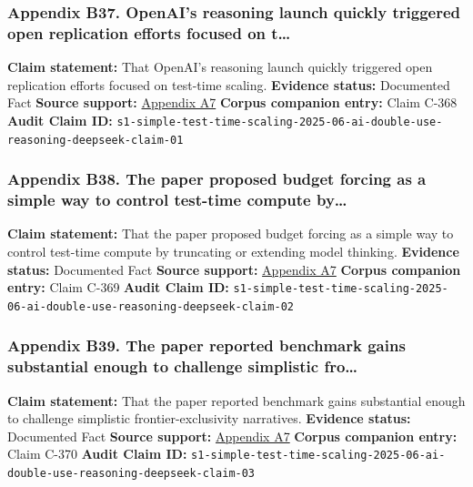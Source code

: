 \documentclass[
  american,
  11pt,
  letterpaper,
]{article}
\begin{document}
\subsubsection{Appendix B37. OpenAI's reasoning launch quickly triggered
open replication efforts focused on
t\ldots{}}\label{appendix-b37-openai-s-reasoning-launch-quickly-triggered-open-replication-efforts-focused-on-t}

\textbf{Claim statement:} That OpenAI's reasoning launch quickly
triggered open replication efforts focused on test-time scaling.
\textbf{Evidence status:} Documented Fact \textbf{Source support:}
\hyperref[appendix-a7-s1-simple-test-time-scaling]{Appendix A7}
\textbf{Corpus companion entry:} Claim C-368 \textbf{Audit Claim ID:}
\texttt{s1-simple-test-time-scaling-2025-06-ai-double-use-reasoning-deepseek-claim-01}

\subsubsection{Appendix B38. The paper proposed budget forcing as a
simple way to control test-time compute
by\ldots{}}\label{appendix-b38-the-paper-proposed-budget-forcing-as-a-simple-way-to-control-test-time-compute-by}

\textbf{Claim statement:} That the paper proposed budget forcing as a
simple way to control test-time compute by truncating or extending model
thinking. \textbf{Evidence status:} Documented Fact \textbf{Source
support:} \hyperref[appendix-a7-s1-simple-test-time-scaling]{Appendix
A7} \textbf{Corpus companion entry:} Claim C-369 \textbf{Audit Claim
ID:}
\texttt{s1-simple-test-time-scaling-2025-06-ai-double-use-reasoning-deepseek-claim-02}

\subsubsection{Appendix B39. The paper reported benchmark gains
substantial enough to challenge simplistic
fro\ldots{}}\label{appendix-b39-the-paper-reported-benchmark-gains-substantial-enough-to-challenge-simplistic-fro}

\textbf{Claim statement:} That the paper reported benchmark gains
substantial enough to challenge simplistic frontier-exclusivity
narratives. \textbf{Evidence status:} Documented Fact \textbf{Source
support:} \hyperref[appendix-a7-s1-simple-test-time-scaling]{Appendix
A7} \textbf{Corpus companion entry:} Claim C-370 \textbf{Audit Claim
ID:}
\texttt{s1-simple-test-time-scaling-2025-06-ai-double-use-reasoning-deepseek-claim-03}
\end{document}

